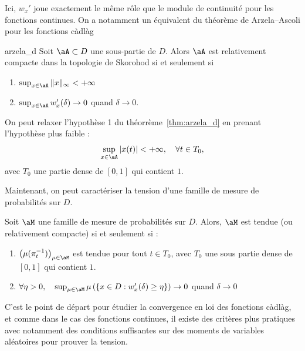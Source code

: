 Ici, $w_x'$ joue exactement le même rôle que le module de continuité pour les fonctions continues. On a notamment un équivalent du théorème de Arzela--Ascoli pour les fonctions
càdlàg
\begin{thm}{}{arzela_d}
	Soit $\aA \subset D$ une sous-partie de $D$. Alors $\aA$ est relativement compacte dans la topologie de Skorohod si et seulement si
	\begin{enumerate}
		\item $\sup_{x \in \aA} \|x\|_\infty < +\infty$
		\item $\sup_{x\in \aA} w_x'(\delta) \to 0$ quand $\delta \to 0$.
	\end{enumerate}
\end{thm}

\begin{rem}
	On peut relaxer l'hypothèse 1 du théorrème~\ref{thm:arzela_d} en prenant l'hypothèse plus faible :
	\[
		\sup_{x \in \aA} |x(t)| < +\infty, \quad \forall t \in T_0,
	\]
	avec $T_0$ une partie dense de $[0,1]$ qui contient $1$.
\end{rem}

Maintenant, on peut caractériser la tension d'une famille de mesure de probabilités sur $D$.
\begin{thm}{}{}
	Soit $\aM$ une famille de mesure de probabilités sur $D$. Alors, $\aM$ est tendue (ou relativement compacte) si et seulement si :
	\begin{enumerate}
		\item $\left(\mu(\pi_t^{-1})\right)_{\mu \in \aM}$ est tendue pour tout $t \in T_0$, avec $T_0$ une sous partie dense de $[0,1]$ qui contient $1$.
		\item $\forall \eta > 0, \quad \sup_{\mu \in \aM} \mu \left(\{x \in D : w_x'(\delta) \ge \eta \}\right) \to 0$ quand $\delta \to 0$
	\end{enumerate}
\end{thm}

C'est le point de départ pour étudier la convergence en loi des fonctions càdlàg, et comme dans le cas des fonctions  continues, il existe des critères plus pratiques avec notamment des conditions suffisantes sur des moments de variables aléatoires pour prouver la tension.

